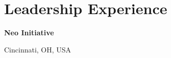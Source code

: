 \documentclass[a4paper,20pt]{article}
\begin{document}
\vspace{-5pt}
\section{Leadership Experience}
    \begin{minipage}{.75\linewidth} \begin{flushleft}
    		\textbf{Neo Initiative}
    	\end{flushleft} \end{minipage}
    \hfill 
    \begin{minipage}{.20\linewidth}\begin{flushright}
    	 Cincinnati, OH, USA
    	\end{flushright}\end{minipage}
     
\end{document}
